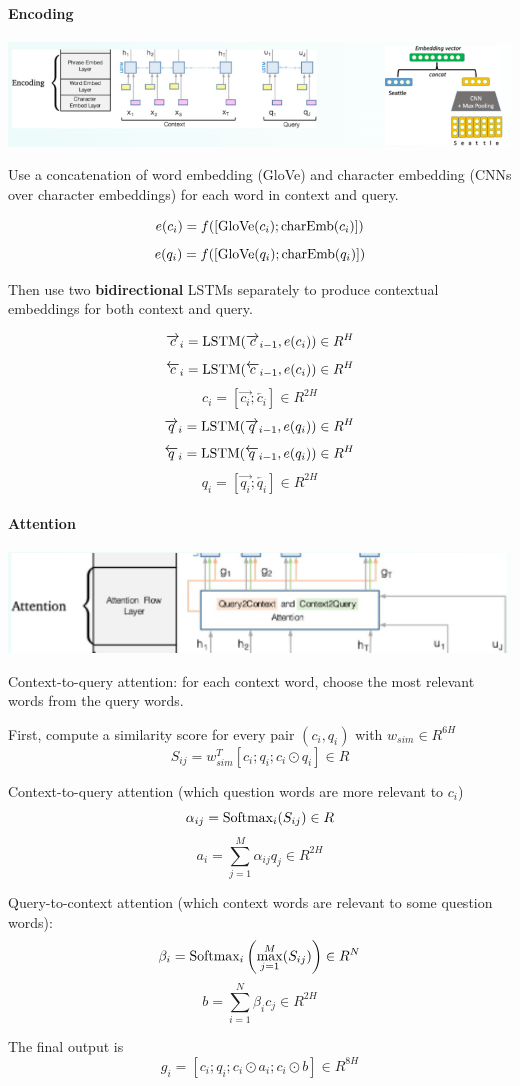 \documentclass[10pt]{report}
\begin{document}
\paragraph{Encoding}
\begin{center}
	\includegraphics[scale=0.5]{125.png}
\end{center}
Use a concatenation of word embedding (GloVe) and character embedding (CNNs over character embeddings) for each word in context and query.
\begin{multicols}{2}
\vfill
$$e(c_i) = f([\hbox{GloVe}(c_i);\hbox{charEmb}(c_i)])$$
\vfill
\columnbreak
\vfill
$$e(q_i) = f([\hbox{GloVe}(q_i);\hbox{charEmb}(q_i)])$$
\vfill
\end{multicols}
Then use two \textbf{bidirectional} LSTMs separately to produce contextual embeddings for both context and query.
\begin{multicols}{2}
\vfill
$$\overrightarrow{c}_i = \hbox{LSTM}(\overrightarrow{c}_{i-1}, e(c_i))\in R^H$$
$$\overleftarrow{c}_i = \hbox{LSTM}(\overleftarrow{c}_{i-1}, e(c_i))\in R^H$$
$$c_i = [\overrightarrow{c_i};\overleftarrow{c_i}]\in R^{2H}$$
\vfill
\columnbreak
\vfill
$$\overrightarrow{q}_i = \hbox{LSTM}(\overrightarrow{q}_{i-1}, e(q_i))\in R^H$$
$$\overleftarrow{q}_i = \hbox{LSTM}(\overleftarrow{q}_{i-1}, e(q_i))\in R^H$$
$$q_i = [\overrightarrow{q_i};\overleftarrow{q_i}]\in R^{2H}$$
\vfill
\end{multicols}
\paragraph{Attention} 
\begin{center}
	\includegraphics[scale=0.5]{126.png}
\end{center}
Context-to-query attention: for each context word, choose the most relevant words from the query words.
\begin{list}{}{}
	\item First, compute a similarity score for every pair $(c_i,q_i)$ with $w_{sim}\in R^{6H}$
	$$S_{ij} = w^T_{sim}[c_i;q_i;c_i\odot q_i] \in R$$
	\item Context-to-query attention (which question words are more relevant to $c_i$)
	$$\alpha_{ij} = \hbox{Softmax}_i(S_{ij})\in R$$
	$$a_i = \sum_{j=1}^M \alpha_{ij}q_j \in R^{2H}$$
	\item Query-to-context attention (which context words are relevant to some question words):
	$$\beta_i = \hbox{Softmax}_i\left(\max_{j=1}^M(S_{ij})\right) \in R^N$$
	$$b = \sum_{i=1}^N\beta_ic_j\in R^{2H}$$
\end{list}
The final output is
$$g_i=[c_i;q_i;c_i\odot a_i;c_i\odot b]\in R^{8H}$$
\end{document}
